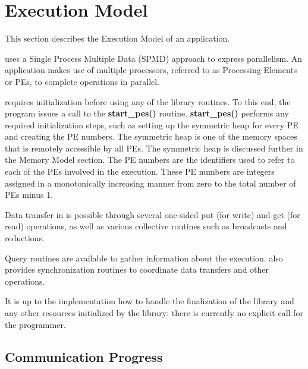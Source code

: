 
\section{Execution Model}

This section describes the Execution Model of an \openshmem application.

\openshmem uses a Single Process Multiple Data (SPMD) approach to express
parallelism. An \openshmem application makes use of multiple processors,
referred to as Processing Elements or PEs, to complete operations
in parallel.


\openshmem requires initialization before using any of the library
routines. To this end, the program issues a call to the \textbf{start\_pes()}
routine. \textbf{start\_pes()} performs any required initialization
steps, such as setting up the symmetric heap for every PE and creating
the PE numbers. The symmetric heap is one of the memory spaces
that is remotely accessible by all PEs. The symmetric heap is discussed
further in the Memory Model section. The PE numbers are the
identifiers used to refer to each of the PEs involved in the execution.
These PE numbers are integers assigned in a monotonically
increasing manner from zero to the total number of PEs minus 1.

Data transfer in \openshmem is possible through several one-sided put
(for write) and get (for read) operations, as well as various collective
routines such as broadcasts and reductions.

Query routines are available to gather information about the execution.
\openshmem also provides synchronization routines to coordinate data
transfers and other operations. 

It is up to the implementation how to handle the finalization of the
\openshmem library and any other resources initialized by the library:
there is currently no explicit call for the programmer.

\subsection{Communication Progress}

